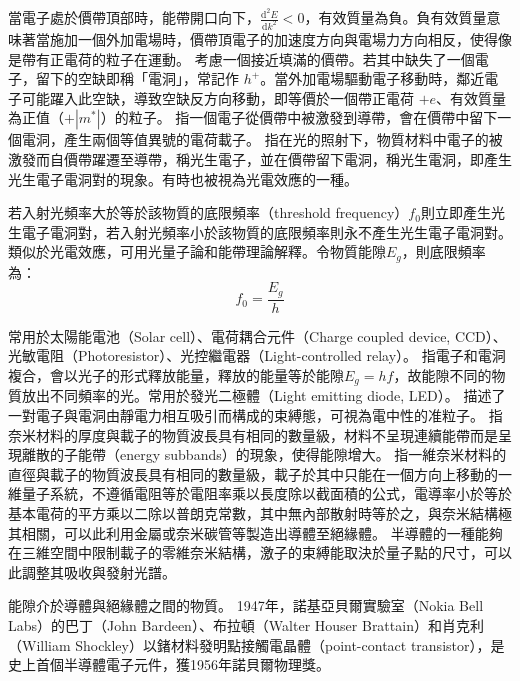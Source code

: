 \documentclass[a4paper,12pt]{report}
\begin{document}
當電子處於價帶頂部時，能帶開口向下，$\frac{\mathrm{d}^2E}{\mathrm{d}k^2}<0$，有效質量為負。負有效質量意味著當施加一個外加電場時，價帶頂電子的加速度方向與電場力方向相反，使得像是帶有正電荷的粒子在運動。
考慮一個接近填滿的價帶。若其中缺失了一個電子，留下的空缺即稱「電洞」，常記作 $h^+$。當外加電場驅動電子移動時，鄰近電子可能躍入此空缺，導致空缺反方向移動，即等價於一個帶正電荷 \(+e\)、有效質量為正值（\(+|m^*|\)）的粒子。
指一個電子從價帶中被激發到導帶，會在價帶中留下一個電洞，產生兩個等值異號的電荷載子。
指在光的照射下，物質材料中電子的被激發而自價帶躍遷至導帶，稱光生電子，並在價帶留下電洞，稱光生電洞，即產生光生電子電洞對的現象。有時也被視為光電效應的一種。

若入射光頻率大於等於該物質的底限頻率（threshold frequency）$f_0$則立即產生光生電子電洞對，若入射光頻率小於該物質的底限頻率則永不產生光生電子電洞對。類似於光電效應，可用光量子論和能帶理論解釋。令物質能隙$E_g$，則底限頻率為：
\[f_0=\frac{E_g}{h}\]

常用於太陽能電池（Solar cell）、電荷耦合元件（Charge coupled device, CCD）、光敏電阻（Photoresistor）、光控繼電器（Light-controlled relay）。
指電子和電洞複合，會以光子的形式釋放能量，釋放的能量等於能隙$E_g=hf$，故能隙不同的物質放出不同頻率的光。常用於發光二極體（Light emitting diode, LED）。
描述了一對電子與電洞由靜電力相互吸引而構成的束縛態，可視為電中性的准粒子。
指奈米材料的厚度與載子的物質波長具有相同的數量級，材料不呈現連續能帶而是呈現離散的子能帶（energy subbands）的現象，使得能隙增大。
指一維奈米材料的直徑與載子的物質波長具有相同的數量級，載子於其中只能在一個方向上移動的一維量子系統，不遵循電阻等於電阻率乘以長度除以截面積的公式，電導率小於等於基本電荷的平方乘以二除以普朗克常數，其中無內部散射時等於之，與奈米結構極其相關，可以此利用金屬或奈米碳管等製造出導體至絕緣體。
半導體的一種能夠在三維空間中限制載子的零維奈米結構，激子的束縛能取決於量子點的尺寸，可以此調整其吸收與發射光譜。


能隙介於導體與絕緣體之間的物質。
1947年，諾基亞貝爾實驗室（Nokia Bell Labs）的巴丁（John Bardeen）、布拉頓（Walter Houser Brattain）和肖克利（William Shockley）以鍺材料發明點接觸電晶體（point-contact transistor），是史上首個半導體電子元件，獲1956年諾貝爾物理獎。
\end{document}
